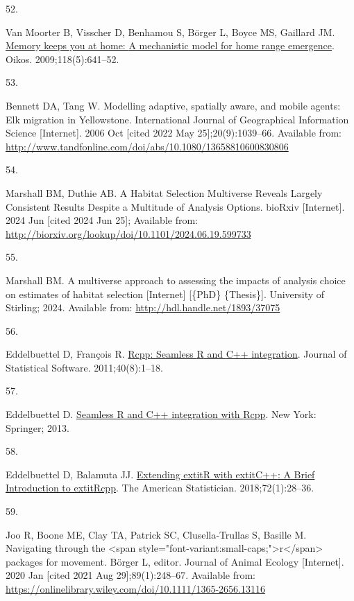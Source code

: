 \documentclass[10pt,a4paper]{article}
\newlength{\cslhangindent}
\newlength{\csllabelwidth}
\newenvironment{CSLReferences}[2] %
{\begin{list}{}{%
	\setlength{\itemindent}{0pt}
	\setlength{\leftmargin}{0pt}
	\setlength{\parsep}{0pt}
	\ifodd #1
	\setlength{\leftmargin}{\cslhangindent}
	\setlength{\itemindent}{-1\cslhangindent}
	\fi
	\setlength{\itemsep}{#2\baselineskip}}}
{\end{list}}
\newcommand{\CSLLeftMargin}[1]{\parbox[t]{\csllabelwidth}{\strut#1\strut}}
\newcommand{\CSLRightInline}[1]{\parbox[t]{\linewidth - \csllabelwidth}{\strut#1\strut}}
\begin{document}
\begin{CSLReferences}{0}{1}
\CSLLeftMargin{52. }%
\CSLRightInline{Van Moorter B, Visscher D, Benhamou S, Börger L, Boyce MS, Gaillard JM. \href{https://doi.org/10.1111/j.1600-0706.2008.17003.x}{Memory keeps you at home: {A} mechanistic model for home range emergence}. Oikos. 2009;118(5):641--52. }

\CSLLeftMargin{53. }%
\CSLRightInline{Bennett DA, Tang W. Modelling adaptive, spatially aware, and mobile agents: {Elk} migration in {Yellowstone}. International Journal of Geographical Information Science {[}Internet{]}. 2006 Oct {[}cited 2022 May 25{]};20(9):1039--66. Available from: \url{http://www.tandfonline.com/doi/abs/10.1080/13658810600830806}}

\CSLLeftMargin{54. }%
\CSLRightInline{Marshall BM, Duthie AB. A {Habitat} {Selection} {Multiverse} {Reveals} {Largely} {Consistent} {Results} {Despite} a {Multitude} of {Analysis} {Options}. bioRxiv {[}Internet{]}. 2024 Jun {[}cited 2024 Jun 25{]}; Available from: \url{http://biorxiv.org/lookup/doi/10.1101/2024.06.19.599733}}

\CSLLeftMargin{55. }%
\CSLRightInline{Marshall BM. A multiverse approach to assessing the impacts of analysis choice on estimates of habitat selection {[}Internet{]} {[}\{PhD\} \{Thesis\}{]}. University of Stirling; 2024. Available from: \url{http://hdl.handle.net/1893/37075}}

\CSLLeftMargin{56. }%
\CSLRightInline{Eddelbuettel D, François R. \href{https://doi.org/10.18637/jss.v040.i08}{{Rcpp}: Seamless {R} and {C++} integration}. Journal of Statistical Software. 2011;40(8):1--18. }

\CSLLeftMargin{57. }%
\CSLRightInline{Eddelbuettel D. \href{https://doi.org/10.1007/978-1-4614-6868-4}{Seamless {R} and {C++} integration with {Rcpp}}. New York: Springer; 2013. }

\CSLLeftMargin{58. }%
\CSLRightInline{Eddelbuettel D, Balamuta JJ. \href{https://doi.org/10.1080/00031305.2017.1375990}{{Extending extit{R} with extit{C++}: A Brief Introduction to extit{Rcpp}}}. The American Statistician. 2018;72(1):28--36. }

\CSLLeftMargin{59. }%
\CSLRightInline{Joo R, Boone ME, Clay TA, Patrick SC, Clusella‐Trullas S, Basille M. Navigating through the {\textless{}}span style="font-variant:small-caps;"{\textgreater{}}r{\textless{}}/span{\textgreater{}} packages for movement. Börger L, editor. Journal of Animal Ecology {[}Internet{]}. 2020 Jan {[}cited 2021 Aug 29{]};89(1):248--67. Available from: \url{https://onlinelibrary.wiley.com/doi/10.1111/1365-2656.13116}}


\end{CSLReferences}
\end{document}
